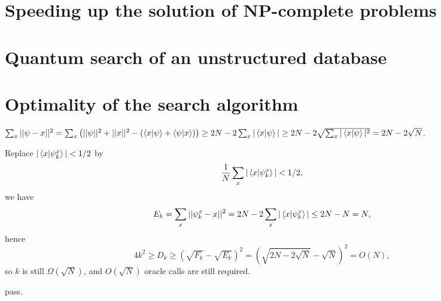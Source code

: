 \section{Speeding up the solution of NP-complete problems}

\section{Quantum search of an unstructured database}

\section{Optimality of the search algorithm}

\ex $\sum_x||\psi-x||^2 = \sum_x\left(||\psi||^2+||x||^2-(\left\langle x\middle|\psi\right\rangle+\left\langle\psi\middle|x\right\rangle)\right) \ge 2N-2\sum_x|\left\langle x\middle|\psi\right\rangle| \ge 2N-2\sqrt{\sum_x|\left\langle x\middle|\psi\right\rangle|^2} = 2N-2\sqrt{N}$.

\ex Replace $|\left\langle x\middle|\psi_k^x\right\rangle|<1/2$ by
$$\frac{1}{N} \sum_x |\left\langle x\middle|\psi_k^x\right\rangle|<1/2,$$
we have
$$E_k = \sum_x ||\psi_k^x-x||^2 = 2N - 2\sum_x|\left\langle x\middle|\psi_k^x\right\rangle| \le 2N - N = N,$$
hence
$$4k^2 \ge D_k \ge (\sqrt{F_k}-\sqrt{E_k})^2 = (\sqrt{2N-2\sqrt{N}}-\sqrt{N})^2 = O(N),$$
so $k$ is still $\Omega(\sqrt{N})$, and $O(\sqrt{N})$ oracle calls are still required.

\ex pass.



